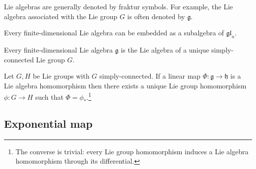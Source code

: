         \begin{notation}
        	Lie algebras are generally denoted by fraktur symbols. For example, the Lie algebra associated with the Lie group $G$ is often denoted by $\mathfrak{g}$.
        \end{notation}
        
	\begin{theorem}[Ado]\label{lie:theorem:ado}
		Every finite-dimensional Lie algebra can be embedded as a subalgebra of $\mathfrak{gl}_n$.
	\end{theorem}
	\begin{theorem}
		Every finite-dimensional Lie algebra $\mathfrak{g}$ is the Lie algebra of a unique simply-connected Lie group $G$.
	\end{theorem}
	
	\begin{property}\label{lie:prop_hom}
		Let $G, H$ be Lie groups with $G$ simply-connected. If a linear map $\Phi:\mathfrak{g}\rightarrow\mathfrak{h}$ is a Lie algebra homomorphism then there exists a unique Lie group homomorphism $\phi:G\rightarrow H$ such that $\Phi = \phi_*$.\footnote{The converse is trivial: every Lie group homomorphism induces a Lie algebra homomorphism through its differential.}
	\end{property}

\subsection{Exponential map}
	
